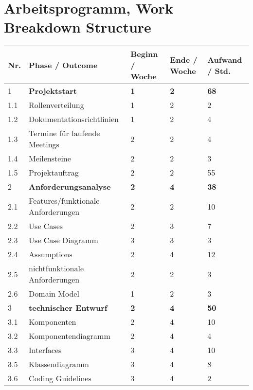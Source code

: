 
\section{Arbeitsprogramm, Work Breakdown Structure}

\begin{tabular}{ | l | p{8cm} | p{2cm}|p{2cm}|p{2cm}|}
\hline
\textbf{Nr.} & \textbf{Phase / Outcome} & \textbf{Beginn / Woche}& \textbf{Ende / Woche}& \textbf{Aufwand / Std.} \\
\hline
1 & \textbf{Projektstart}                      & \textbf{1} & \textbf{2} & \textbf{68} \\
\hline
1.1& Rollenverteilung                  &1 &2 &2 \\
\hline
1.2 &Dokumentationsrichtlinien         &1 &2 &4 \\
\hline
1.3 &Termine für laufende Meetings     &2 &2 &4 \\
\hline
1.4 &Meilensteine                      &2 &2 &3 \\
\hline
1.5 &Projektauftrag                    &2 &2 &55 \\
\hline
2&\textbf{Anforderungsanalyse}               &\textbf{2} &\textbf{4}&\textbf{38}  \\
\hline
2.1 &Features/funktionale Anforderungen&2 &2 &10 \\
\hline
2.2 &Use Cases                         &2 &3 &7  \\
\hline
2.3 &Use Case Diagramm                 &3 &3 & 3 \\
\hline
2.4 &Assumptions                       &2 &4 & 12 \\
\hline
2.5 &nichtfunktionale Anforderungen    &2 &2 & 3 \\
\hline
2.6 &Domain Model                      &1 &2 & 3 \\
\hline
3&\textbf{technischer Entwurf}              &\textbf{2} &\textbf{4} & \textbf{50}  \\
\hline
3.1 &Komponenten                       &2 &4 & 10 \\
\hline
3.2 &Komponentendiagramm               &2 &4 & 4 \\
\hline
3.3 &Interfaces                        &3 &4 & 10 \\
\hline
3.5 &Klassendiagramm                   &3 &4 & 8 \\
\hline
3.6 &Coding Guidelines                 &3 &4 & 2 \\

\end{tabular}
